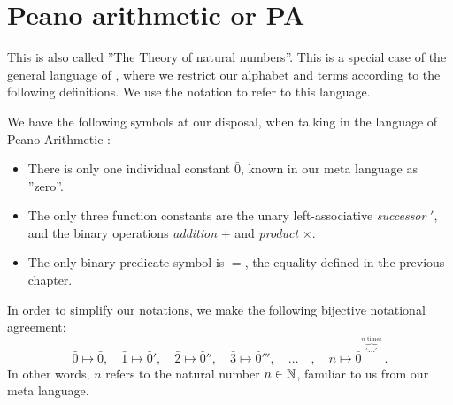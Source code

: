 \section{Peano arithmetic or PA}%
\label{sec:peano-arithmetic}

This is also called ''The Theory of natural numbers''.
This is a special case of the general language of \LK{},
where we restrict our alphabet and terms according to the following
definitions. We use the notation \LN{} to refer to this language.

\begin{definition}[Alphabet of \PA{}]\label{def:alphabet of peano arithmetic}
    We have the following symbols at our disposal,
    when talking in the language of Peano Arithmetic \PA:
    \begin{itemize}
        \item
            There is only one individual constant \(\bar0\),
            known in our meta language as ''zero''.
        \item
            The only three function constants are the unary left-associative
            \emph{successor} \('\), and the binary operations
            \emph{addition} \(+\) and \emph{product} \(\times\).
        \item
            The only binary predicate symbol is \(=\),
            the equality defined in the previous chapter.
    \end{itemize}
\end{definition}

\begin{definition}[Numerals]\label{def:numerals}
    In order to simplify our notations,
    we make the following bijective notational agreement:
    \begin{equation*}
        \bar0\mapsto\bar0,\quad
        \bar1\mapsto\bar0',\quad
        \bar2\mapsto\bar0'',\quad
        \bar3\mapsto\bar0''',\quad
        \ldots\quad,\quad
        \bar{n}\mapsto\bar0^{\overbrace{\prime\cdots\prime}^{n\text{ times}}}\,.
    \end{equation*}
    In other words, \(\bar{n}\) refers to the natural number \(n\in\mathbb{N}\),
    familiar to us from our meta language.
\end{definition}

